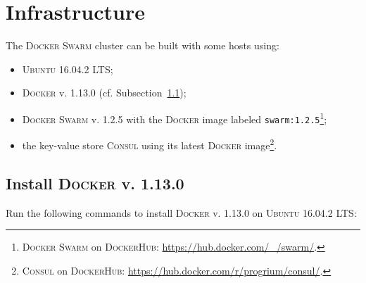 
\section{Infrastructure}
\label{sec:infrastructure}

The \textsc{Docker Swarm} cluster can be built with some hosts using:

\begin{itemize}
  \item \textsc{Ubuntu 16.04.2 LTS};
  \item \textsc{Docker} v. 1.13.0 (cf. Subsection~\ref{subsec:docker_install});
  \item \textsc{Docker Swarm} v. 1.2.5 with the \textsc{Docker} image labeled \texttt{swarm:1.2.5}\footnote{\textsc{Docker Swarm} on \textsc{DockerHub}: \url{https://hub.docker.com/_/swarm/}.};
  \item the key-value store \textsc{Consul} using its latest \textsc{Docker} image\footnote{\textsc{Consul} on \textsc{DockerHub}: \url{https://hub.docker.com/r/progrium/consul/}.}.
\end{itemize}

\newpage

\subsection{Install \textsc{Docker} v. 1.13.0}
\label{subsec:docker_install}

Run the following commands to install \textsc{Docker} v. 1.13.0 on \textsc{Ubuntu 16.04.2 LTS}:

